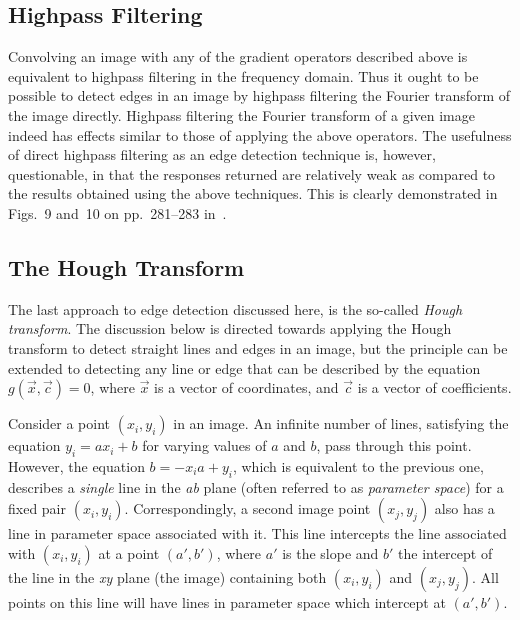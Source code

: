 
\subsection{Highpass Filtering}
\label{image:edge:highpass}

Convolving an image with any of the gradient operators described above
is equivalent to highpass filtering in the frequency domain.  Thus it
ought to be possible to detect edges in an image by highpass filtering
the Fourier transform of the image directly.  Highpass filtering the
Fourier transform of a given image indeed has effects similar to those
of applying the above operators.  The usefulness of direct highpass
filtering as an edge detection technique is, however, questionable, in
that the responses returned are relatively weak as compared to the
results obtained using the above techniques.  This is clearly
demonstrated in Figs.~9 and~10 on pp.~281--283 in~\cite{digpic}.

\subsection{The Hough Transform}
\label{image:edge:hough}

The last approach to edge detection discussed here, is the so-called
{\em Hough transform\/}.  The discussion below is directed towards
applying the Hough transform to detect straight lines and edges in an
image, but the principle can be extended to detecting any line or
edge that can be described by the equation $g(\vec{x},\vec{c})=0$,
where $\vec{x}$ is a vector of coordinates, and $\vec{c}$ is a vector
of coefficients.

Consider a point $(x_{i},y_{i})$ in an image.  An infinite number of
lines, satisfying the equation $y_{i}=ax_{i}+b$ for varying values of
$a$ and $b$, pass through this point.  However, the equation
$b=-x_{i}a+y_{i}$, which is equivalent to the previous one, describes
a {\em single\/} line in the {\it ab\/} plane (often referred to as
{\em parameter space\/}) for a fixed pair $(x_{i},y_{i})$.
Correspondingly, a second image point $(x_{j},y_{j})$ also has a line
in parameter space associated with it.  This line intercepts the line
associated with $(x_{i},y_{i})$ at a point $(a',b')$, where $a'$ is
the slope and $b'$ the intercept of the line in the {\it xy\/} plane
(the image) containing both $(x_{i},y_{i})$ and $(x_{j},y_{j})$.  All
points on this line will have lines in parameter space which intercept
at $(a',b')$.

